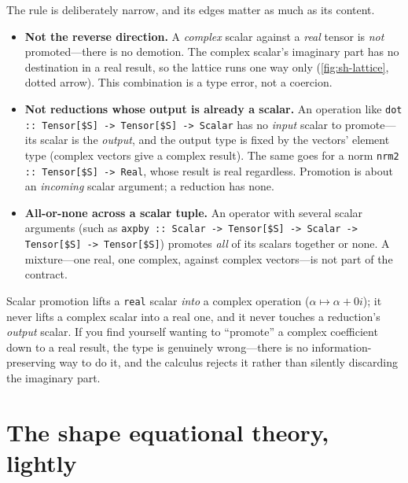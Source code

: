 The rule is deliberately narrow, and its edges matter as much as its content.

\begin{itemize}[leftmargin=1.4em]
\item \textbf{Not the reverse direction.} A \emph{complex} scalar against a
\emph{real} tensor is \emph{not} promoted---there is no demotion. The complex
scalar's imaginary part has no destination in a real result, so the lattice
runs one way only (\cref{fig:sh-lattice}, dotted arrow). This combination is a
type error, not a coercion.

\item \textbf{Not reductions whose output is already a scalar.} An operation
like \lstinline[style=l4style]|dot :: Tensor[$S] -> Tensor[$S] -> Scalar| has
no \emph{input} scalar to promote---its scalar is the \emph{output}, and the
output type is fixed by the vectors' element type (complex vectors give a
complex result). The same goes for a norm
\lstinline[style=l4style]|nrm2 :: Tensor[$S] -> Real|, whose result is real
regardless. Promotion is about an \emph{incoming} scalar argument; a reduction
has none.

\item \textbf{All-or-none across a scalar tuple.} An operator with several
scalar arguments (such as
\lstinline[style=l4style]|axpby :: Scalar -> Tensor[$S] -> Scalar -> Tensor[$S] -> Tensor[$S]|)
promotes \emph{all} of its scalars together or none. A mixture---one real, one
complex, against complex vectors---is not part of the contract.
\end{itemize}

\begin{pitfall}
Scalar promotion lifts a \texttt{real} scalar \emph{into} a complex operation
($\alpha \mapsto \alpha + 0i$); it never lifts a complex scalar into a real
one, and it never touches a reduction's \emph{output} scalar. If you find
yourself wanting to ``promote'' a complex coefficient down to a real result,
the type is genuinely wrong---there is no information-preserving way to do it,
and the calculus rejects it rather than silently discarding the imaginary part.
\end{pitfall}

\section{The shape equational theory, lightly}
\label{sec:sh-equational}

